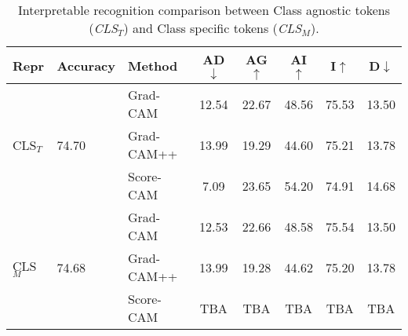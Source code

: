 \begin{table}[H]
    \centering
    \footnotesize
    \setlength{\tabcolsep}{2.5pt}
    \begin{tabular}{lllccccc}\toprule                    
        Repr&Accuracy&Method&AD$\downarrow$&AG$\uparrow$&AI$\uparrow$&I$\uparrow$&D$\downarrow$\\\midrule
        \multirow{3}{*}{CLS$_T$}&\multirow{3}{*}{74.70}&Grad-CAM&12.54&22.67&48.56&75.53&13.50\\
            & &Grad-CAM++&13.99&19.29&44.60&75.21&13.78\\
            & &Score-CAM&7.09&23.65&54.20&74.91&14.68\\\midrule
            \multirow{3}{*}{CLS$_M$}&\multirow{3}{*}{74.68}&Grad-CAM&12.53&22.66&48.58&75.54&13.50\\
            & &Grad-CAM++&13.99&19.28&44.62&75.20&13.78\\
            & &Score-CAM&TBA&TBA&TBA&TBA&TBA\\\bottomrule
    \end{tabular}
    \vspace{3pt}
    \caption{Interpretable recognition comparison between Class agnostic tokens (\emph{CLS$_T$}) and Class specific tokens (\emph{CLS$_M$}).}
    \label{tab:TokenvMatrix}
\end{table}